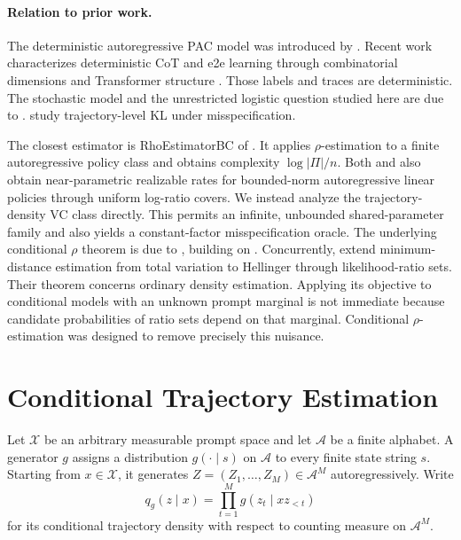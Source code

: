\documentclass[twoside]{article}
\newcommand{\A}{\mathcal A}
\begin{document}
\paragraph{Relation to prior work.} The deterministic autoregressive PAC model was introduced by \citet{joshi2025}. Recent work characterizes deterministic CoT and e2e learning through combinatorial dimensions and Transformer structure \citep{hanneke2026,li2026,yang2026}. Those labels and traces are deterministic. The stochastic model and the unrestricted logistic question studied here are due to \citet{doron2026stochastic}. \citet{xu2026} study trajectory-level KL under misspecification.

The closest estimator is RhoEstimatorBC of \citet{rohatgi2025}. It applies $\rho$-estimation to a finite autoregressive policy class and obtains complexity $\log|\Pi|/n$. Both \citet{foster2024} and \citet{rohatgi2025} also obtain near-parametric realizable rates for bounded-norm autoregressive linear policies through uniform log-ratio covers. We instead analyze the trajectory-density VC class directly. This permits an infinite, unbounded shared-parameter family and also yields a constant-factor misspecification oracle. The underlying conditional $\rho$ theorem is due to \citet{baraud2018}, building on \citet{baraud2017}. Concurrently, \citet{compton2026} extend minimum-distance estimation from total variation to Hellinger through likelihood-ratio sets. Their theorem concerns ordinary density estimation. Applying its objective to conditional models with an unknown prompt marginal is not immediate because candidate probabilities of ratio sets depend on that marginal. Conditional $\rho$-estimation was designed to remove precisely this nuisance.

\section{Conditional Trajectory Estimation}
\label{sec:setup}

Let $\mathcal X$ be an arbitrary measurable prompt space and let $\A$ be a finite alphabet. A generator $g$ assigns a distribution $g(\cdot\mid s)$ on $\A$ to every finite state string $s$. Starting from $x\in\mathcal X$, it generates $Z=(Z_1,\ldots,Z_M)\in\A^M$ autoregressively. Write
\begin{equation}
 q_g(z\mid x)=\prod_{t=1}^M g(z_t\mid xz_{<t})
 \label{eq:path-density}
\end{equation}
for its conditional trajectory density with respect to counting measure on $\A^M$.
\end{document}
